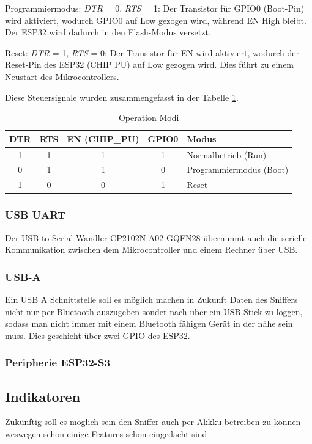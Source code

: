 Programmiermodus:
\textit{DTR} = 0, \textit{RTS} = 1: Der Transistor für GPIO0 (Boot-Pin) wird aktiviert, wodurch GPIO0 auf Low gezogen wird, während EN High bleibt. Der ESP32 wird dadurch in den Flash-Modus versetzt.

Reset:
\textit{DTR} = 1, \textit{RTS} = 0: Der Transistor für EN wird aktiviert, wodurch der Reset-Pin des ESP32 (CHIP PU) auf Low gezogen wird. Dies führt zu einem Neustart des Mikrocontrollers. 

Diese Steuersignale wurden  zusammengefasst in der Tabelle \ref{tab:operation_modes}.
\begin{table}[h]
  \centering
  \begin{tabular}{|c|c|c|c|l|}
    \hline
    DTR & RTS & EN (CHIP\_PU) & GPIO0 & Modus \\ \hline
    1   & 1   & 1            & 1     & Normalbetrieb (Run) \\ \hline
    0   & 1   & 1            & 0     & Programmiermodus (Boot) \\ \hline
    1   & 0   & 0            & 1     & Reset \\ \hline
  \end{tabular}
  \caption{Operation Modi}
  \label{tab:operation_modes}
\end{table}

\subsubsection{USB UART}
Der USB-to-Serial-Wandler CP2102N-A02-GQFN28 übernimmt auch die serielle Kommunikation zwischen dem Mikrocontroller und einem Rechner über USB. 

\subsubsection{USB-A}
Ein USB A Schnittstelle soll es möglich machen in Zukunft Daten des Sniffers nicht nur per Bluetooth auszugeben sonder nach über ein USB Stick zu loggen, sodass man nicht immer mit einem Bluetooth fähigen Gerät in der nähe sein muss. Dies geschieht über zwei GPIO des ESP32. 
\subsubsection{Peripherie ESP32-S3}


\subsection{Indikatoren}
Zukünftig soll es möglich sein den Sniffer auch per Akkku betreiben zu können weswegen schon einige Features schon eingedacht sind

